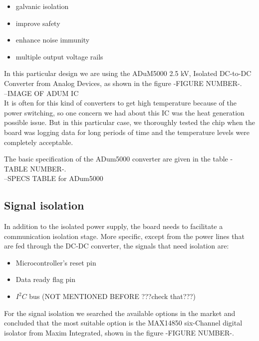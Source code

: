 \begin{itemize}
    \item galvanic isolation
    \item improve safety
    \item enhance noise immunity
    \item multiple output voltage rails
\end{itemize}

In this particular design we are using the ADuM5000 2.5 kV, Isolated DC-to-DC Converter from Analog Devices, as shown in the figure -FIGURE NUMBER-.\\

--IMAGE OF ADUM IC\\

It is often for this kind of converters to get high temperature because of the power switching, so one concern we had about this IC was the heat generation possible issue. But in this particular case, we thoroughly tested the chip when the board was logging data for long periods of time and the temperature levels were completely acceptable.

The basic specification of the ADum5000 converter are given in the table -TABLE NUMBER-.\\

--SPECS TABLE for ADum5000\\

\subsection{Signal isolation}
In addition to the isolated power supply, the board needs to facilitate a communication isolation stage. More specific, except from the power lines that are fed through the DC-DC converter, the signals that need isolation are:

\begin{itemize}
    \item Microcontroller's reset pin
    \item Data ready flag pin
    \item $I^2C$ bus (NOT MENTIONED BEFORE ???check that???)
\end{itemize}

For the signal isolation we searched the available options in the market and concluded that the most suitable option is the MAX14850 six-Channel digital isolator from Maxim Integrated, shown in the figure -FIGURE NUMBER-.\\

